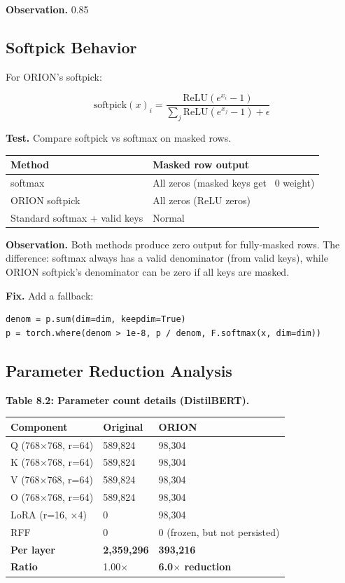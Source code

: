 \textbf{Observation.} 0.85

\subsection{Softpick Behavior}

For ORION's softpick:

\[
\text{softpick}(x)_i = \frac{\text{ReLU}(e^{x_i} - 1)}{\sum_j \text{ReLU}(e^{x_j} - 1) + \epsilon}
\]

\textbf{Test.} Compare softpick vs softmax on masked rows.

\begin{table}[H]
\centering
\small
\begin{tabular}{ll}
\toprule
\textbf{Method} & \textbf{Masked row output} \\
\midrule
softmax & All zeros (masked keys get ~0 weight) \\
ORION softpick & All zeros (ReLU zeros) \\
Standard softmax + valid keys & Normal \\
\bottomrule
\end{tabular}
\end{table}

\textbf{Observation.} Both methods produce zero output for fully-masked rows. 
The difference: softmax always has a valid denominator (from valid keys), 
while ORION softpick's denominator can be zero if all keys are masked.

\textbf{Fix.} Add a fallback:

\begin{lstlisting}
denom = p.sum(dim=dim, keepdim=True)
p = torch.where(denom > 1e-8, p / denom, F.softmax(x, dim=dim))
\end{lstlisting}

\subsection{Parameter Reduction Analysis}

\textbf{Table 8.2: Parameter count details (DistilBERT).}

\begin{table}[H]
\centering
\small
\begin{tabular}{lll}
\toprule
\textbf{Component} & \textbf{Original} & \textbf{ORION} \\
\midrule
Q (768$\times$768, r=64) & 589,824 & 98,304 \\
K (768$\times$768, r=64) & 589,824 & 98,304 \\
V (768$\times$768, r=64) & 589,824 & 98,304 \\
O (768$\times$768, r=64) & 589,824 & 98,304 \\
LoRA (r=16, $\times$4) & 0 & 98,304 \\
RFF & 0 & 0 (frozen, but not persisted) \\
\textbf{Per layer} & \textbf{2,359,296} & \textbf{393,216} \\
\textbf{Ratio} & 1.00$\times$ & \textbf{6.0$\times$ reduction} \\
\bottomrule
\end{tabular}
\end{table}

